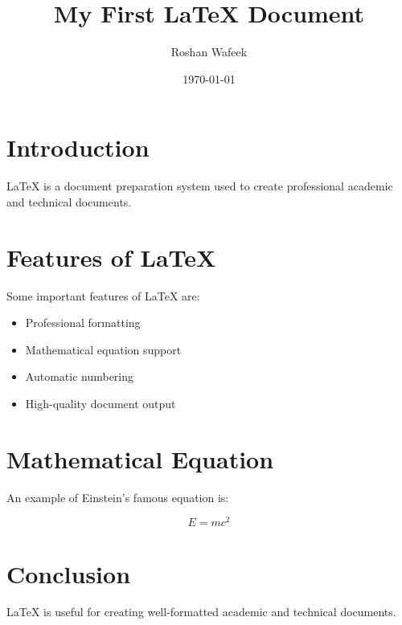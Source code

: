 \documentclass{article}
\title{My First LaTeX Document}
\author{Roshan Wafeek}
\date{\today}
\begin{document}
\maketitle

\section{Introduction}

LaTeX is a document preparation system used to create
professional academic and technical documents.

\section{Features of LaTeX}

Some important features of LaTeX are:

\begin{itemize}
    \item Professional formatting
    \item Mathematical equation support
    \item Automatic numbering
    \item High-quality document output
\end{itemize}

\section{Mathematical Equation}

An example of Einstein's famous equation is:

\[
E = mc^2
\]

\section{Conclusion}

LaTeX is useful for creating well-formatted
academic and technical documents.
\end{document}
